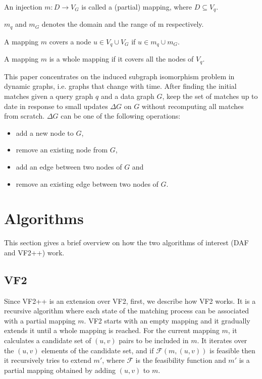 \begin{definition}
    An injection $m : D \rightarrow V_G$ is called a (partial) mapping, where $D \subseteq V_q$.
\end{definition}

\begin{definition}
    $m_q$ and $m_G$ denotes the domain and the range of m respectively.
\end{definition}

\begin{definition}
    A mapping $m$ covers a node $u \in V_q \cup V_G$ if $u \in m_q \cup m_G$.
\end{definition}

\begin{definition}
    A mapping $m$ is a whole mapping if it covers all the nodes of $V_q$.
\end{definition}


This paper concentrates on the induced subgraph isomorphism problem in dynamic graphs, 
i.e. graphs that change with time. After finding the initial matches given a query graph
\(q\) and a data graph \(G\), keep the set of matches up to date in response to small 
updates \(\Delta G \) on \(G\) without recomputing all matches from scratch. \(\Delta G\) 
can be one of the following operations:
\begin{itemize}
    \item add a new node to \(G\),
    \item remove an existing node from \(G\),
    \item add an edge between two nodes of \(G\) and
    \item remove an existing edge between two nodes of \(G\).
\end{itemize}

\section{Algorithms}

This section gives a brief overview on how the two algorithms of interest (DAF and VF2++)
work.

\subsection{VF2}

Since VF2++ is an extension over VF2, first, we describe how VF2 works. It is a recursive 
algorithm where each state of the matching process can be associated with a partial mapping
$m$. VF2 starts with an empty mapping  and it 
gradually extends it until a whole mapping is reached. For the current mapping $m$, it calculates a 
candidate set of $(u, v)$ pairs to be included in $m$. It iterates over the
$(u, v)$ elements of the candidate set, and if $\mathcal{F}(m, (u, v))$ is feasible then it recursively 
tries to extend $m'$, where $\mathcal{F}$ is the feasibility function and $m'$ is a partial mapping
obtained by adding $(u, v)$ to $m$.

